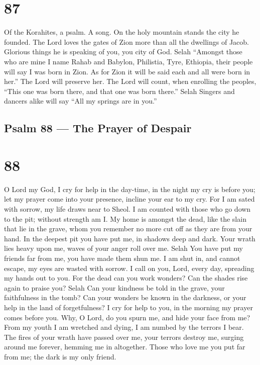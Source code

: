 \hypertarget{section-86}{%
\section{87}\label{section-86}}

Of the Korahites, a psalm. A song.  On the holy mountain
stands the city he founded.  The Lord loves the gates of
Zion more than all the dwellings of Jacob.  Glorious things
he is speaking of you, you city of God. Selah  ``Amongst
those who are mine I name Rahab and Babylon, Philistia, Tyre, Ethiopia,
their people will say I was born in Zion.  As for Zion it
will be said each and all were born in her.'' The Lord will preserve
her.  The Lord will count, when enrolling the peoples,
``This one was born there, and that one was born there.'' Selah
 Singers and dancers alike will say ``All my springs are in
you.''

\hypertarget{psalm-88-the-prayer-of-despair}{%
\subsection{Psalm 88 --- The Prayer of
Despair}\label{psalm-88-the-prayer-of-despair}}

\hypertarget{section-87}{%
\section{88}\label{section-87}}

 O Lord my God, I cry for help in the day-time, in the night
my cry is before you;  let my prayer come into your
presence, incline your ear to my cry.  For I am sated with
sorrow, my life draws near to Sheol.  I am counted with
those who go down to the pit; without strength am I.  My
home is amongst the dead, like the slain that lie in the grave, whom you
remember no more cut off as they are from your hand.  In the
deepest pit you have put me, in shadows deep and dark.  Your
wrath lies heavy upon me, waves of your anger roll over me. Selah
 You have put my friends far from me, you have made them
shun me. I am shut in, and cannot escape,  my eyes are
wasted with sorrow. I call on you, Lord, every day, spreading my hands
out to you.  For the dead can you work wonders? Can the
shades rise again to praise you? Selah  Can your kindness
be told in the grave, your faithfulness in the tomb?  Can
your wonders be known in the darkness, or your help in the land of
forgetfulness?  I cry for help to you, in the morning my
prayer comes before you.  Why, O Lord, do you spurn me, and
hide your face from me?  From my youth I am wretched and
dying, I am numbed by the terrors I bear.  The fires of
your wrath have passed over me, your terrors destroy me, 
surging around me forever, hemming me in altogether.  Those
who love me you put far from me; the dark is my only friend.

